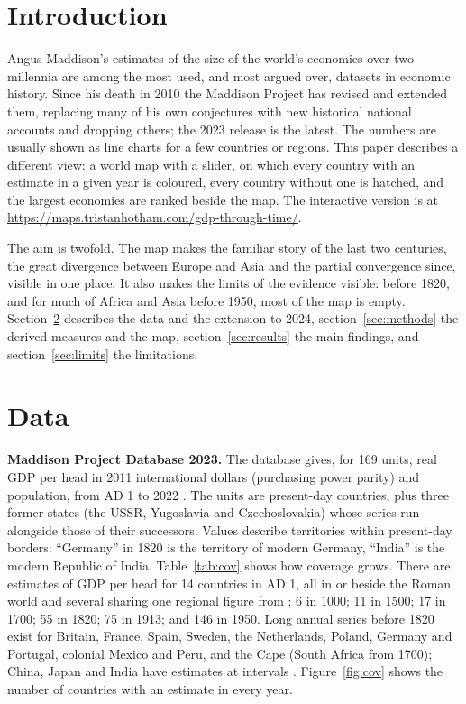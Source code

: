 \documentclass[11pt,a4paper]{article}
\begin{document}
\section{Introduction}
Angus Maddison's estimates of the size of the world's economies over two millennia \citep{maddison2001,maddison2007} are among the most used, and most argued over, datasets in economic history. Since his death in 2010 the Maddison Project has revised and extended them, replacing many of his own conjectures with new historical national accounts and dropping others; the 2023 release \citep{mpd2023} is the latest. The numbers are usually shown as line charts for a few countries or regions. This paper describes a different view: a world map with a slider, on which every country with an estimate in a given year is coloured, every country without one is hatched, and the largest economies are ranked beside the map. The interactive version is at \url{https://maps.tristanhotham.com/gdp-through-time/}.

The aim is twofold. The map makes the familiar story of the last two centuries, the great divergence between Europe and Asia \citep{pomeranz2000} and the partial convergence since, visible in one place. It also makes the limits of the evidence visible: before 1820, and for much of Africa and Asia before 1950, most of the map is empty. Section~\ref{sec:data} describes the data and the extension to 2024, section~\ref{sec:methods} the derived measures and the map, section~\ref{sec:results} the main findings, and section~\ref{sec:limits} the limitations.

\section{Data}\label{sec:data}
\textbf{Maddison Project Database 2023.} The database gives, for 169 units, real GDP per head in 2011 international dollars (purchasing power parity) and population, from AD 1 to 2022 \citep{mpd2023}. The units are present-day countries, plus three former states (the USSR, Yugoslavia and Czechoslovakia) whose series run alongside those of their successors. Values describe territories within present-day borders: ``Germany'' in 1820 is the territory of modern Germany, ``India'' is the modern Republic of India. Table~\ref{tab:cov} shows how coverage grows. There are estimates of GDP per head for 14 countries in AD 1, all in or beside the Roman world and several sharing one regional figure from \citet{scheidel2009}; 6 in 1000; 11 in 1500; 17 in 1700; 55 in 1820; 75 in 1913; and 146 in 1950. Long annual series before 1820 exist for Britain, France, Spain, Sweden, the Netherlands, Poland, Germany and Portugal, colonial Mexico and Peru, and the Cape (South Africa from 1700); China, Japan and India have estimates at intervals \citep{broadberry2015,broadberry2018,bassino2019,broadberry2015india}. Figure~\ref{fig:cov} shows the number of countries with an estimate in every year.
\end{document}

